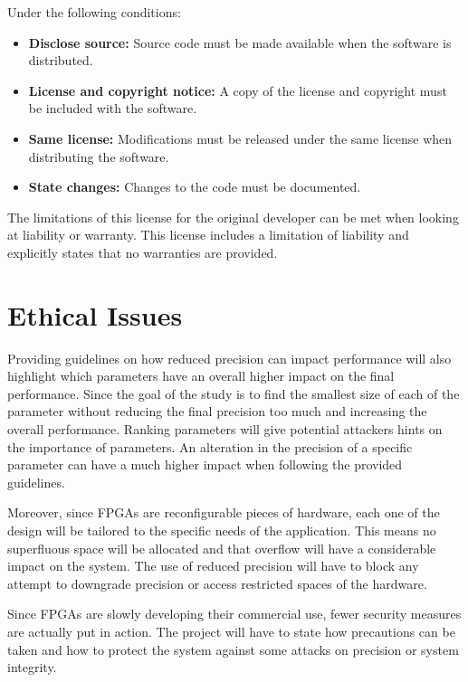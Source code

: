 Under the following conditions:

\begin{itemize}
  \item \textbf{Disclose source:} Source code must be made available when the software is distributed.
  \item \textbf{License and copyright notice:} A copy of the license and copyright must be included with the software.
  \item \textbf{Same license:} Modifications must be released under the same license when distributing the software.
  \item \textbf{State changes:} Changes to the code must be documented.
\end{itemize}

The limitations of this license for the original developer can be met when looking at liability or warranty. This license includes a limitation of liability and explicitly states that no warranties are provided.



\section{Ethical Issues}

Providing guidelines on how reduced precision can impact performance will also highlight which parameters have an overall higher impact on the final performance. Since the goal of the study is to find the smallest size of each of the parameter without reducing the final precision too much and increasing the overall performance. Ranking parameters will give potential attackers hints on the importance of parameters. An alteration in the precision of a specific parameter can have a much higher impact when following the provided guidelines.

Moreover, since FPGAs are reconfigurable pieces of hardware, each one of the design will be tailored to the specific needs of the application. This means no superfluous space will be allocated and that overflow will have a considerable impact on the system. The use of reduced precision will have to block any attempt to downgrade precision or access restricted spaces of the hardware.

Since FPGAs are slowly developing their commercial use, fewer security measures are actually put in action. The project will have to state how precautions can be taken and how to protect the system against some attacks on precision or system integrity.


